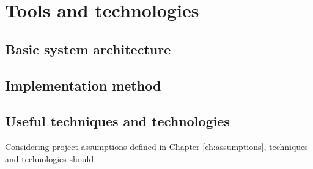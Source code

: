 \chapter{Tools and technologies}
\section{Basic system architecture}\label{sec:requirements:functional}


\section{Implementation method}\label{sec:requirements:functional}


\section{Useful techniques and technologies}\label{sec:market:technologies}
Considering project assumptions defined in Chapter \ref{ch:assumptions}, techniques and technologies should 
